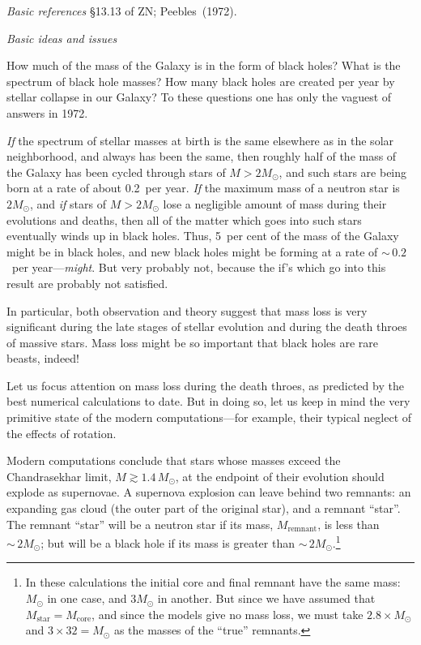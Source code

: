 \textit{Basic references}\quad
\S13.13 of ZN\cite{ZN1971};
Peebles~(1972)\cite{Peebles1972}.

\bigskip\noindent
\textit{Basic ideas and issues}

\medskip\noindent
How much of the mass of the Galaxy is in the form of black holes?  What is the
spectrum of black hole masses?  How many black holes are created per year by
stellar collapse in our Galaxy?  To these questions one has only the vaguest of
answers in 1972.

\textit{If\/} the spectrum of stellar masses at birth is the same elsewhere as in the solar
neighborhood, and always has been the same, then roughly half of the mass of the
Galaxy has been cycled through stars of $M > 2M_\odot$, and such stars are being
born at a rate of about 0.2~per year.  \textit{If\/} the maximum mass of a neutron star is
$2M_\odot$, and \textit{if\/} stars of $M > 2M_\odot$ lose a negligible amount of mass during their
evolutions and deaths, then all of the matter which goes into such stars eventually
winds up in black holes.  Thus, 5~per cent of the mass of the Galaxy might be in
black holes, and new black holes might be forming at a rate of ${\sim}\,0.2$~per
year---\textit{might}.  But very probably not, because the if's which go into this result
are probably not satisfied.

In particular, both observation and theory suggest that mass loss is very
significant during the late stages of stellar evolution and during the death throes
of massive stars.  Mass loss might be so important that black holes are rare
beasts, indeed!

Let us focus attention on mass loss during the death throes, as predicted by
the best numerical calculations to date.  But in doing so, let us keep in mind the
very primitive state of the modern computations---for example, their typical
neglect of the effects of rotation.

Modern computations conclude that stars whose masses exceed the
Chandrasekhar limit, $M\gtrsim 1.4\,M_\odot$, at the endpoint of their evolution should
explode as supernovae.  A supernova explosion can leave behind two remnants: an
expanding gas cloud (the outer part of the original star), and a remnant ``star''.
The remnant ``star'' will be a neutron star if its mass, $M_{\text{remnant}}$, is less
than ${\sim}\,2M_\odot$; but will be a black hole if its mass is greater than
${\sim}\,2M_\odot$.\footnote{In these calculations the initial core and final remnant
have the same mass: $M_\odot$ in one case, and $3M_\odot$ in another.
But since we have assumed that $M_{\text{star}} = M_{\text{core}}$, and since the models
give no mass loss, we must take $2.8\times M_\odot$ and $3\times 32 = M_\odot$ as the
masses of the ``true'' remnants.}

